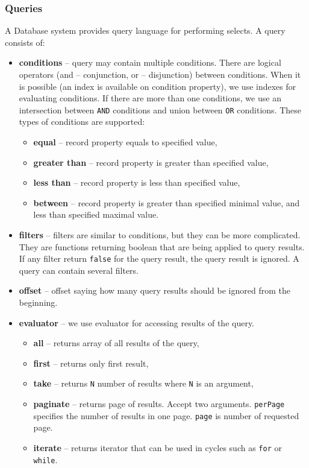 \subsubsection{Queries} 
A Database system provides query language for performing selects. A query consists of:
\begin{itemize}
    \item \textbf{conditions} -- query may contain multiple conditions. There are logical operators (and -- conjunction, or -- disjunction) between conditions. When it is possible (an index is available on condition property), we use indexes for evaluating conditions. If there are more than one conditions, we use an intersection between \texttt{AND} conditions and union between \texttt{OR} conditions. These types of conditions are supported:
    \begin{itemize}
        \item \textbf{equal} -- record property equals to specified value,
        \item \textbf{greater than} -- record property is greater than specified value,
        \item \textbf{less than} -- record property is less than specified value,
        \item \textbf{between} -- record property is greater than specified minimal value, and less than specified maximal value.
    \end{itemize} 
    \item \textbf{filters} -- filters are similar to conditions, but they can be more complicated. They are functions returning boolean that are being applied to query results. If any filter return \texttt{false} for the query result, the query result is ignored. A query can contain several filters.
    \item \textbf{offset} -- offset saying how many query results should be ignored from the beginning.
    \item \textbf{evaluator} -- we use evaluator for accessing results of the query.
    \begin{itemize}
        \item \textbf{all} -- returns array of all results of the query,
        \item \textbf{first} -- returns only first result,
        \item \textbf{take} -- returns \texttt{N} number of results where \texttt{N} is an argument,
        \item \textbf{paginate} -- returns page of results. Accept two arguments. \texttt{perPage} specifies the number of results in one page. \texttt{page} is number of requested page.
        \item \textbf{iterate} -- returns iterator that can be used in cycles such as \texttt{for} or \texttt{while}.
    \end{itemize}
\end{itemize}  

